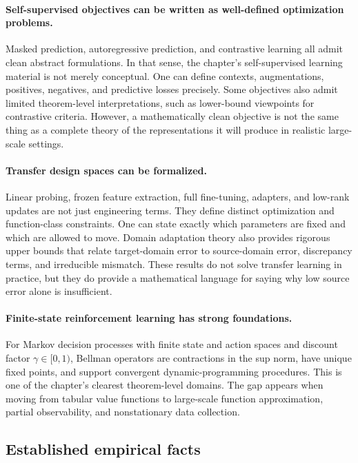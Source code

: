 \paragraph{Self-supervised objectives can be written as well-defined optimization problems.}
Masked prediction, autoregressive prediction, and contrastive learning all admit clean abstract formulations. In that sense, the chapter's self-supervised learning material is not merely conceptual. One can define contexts, augmentations, positives, negatives, and predictive losses precisely. Some objectives also admit limited theorem-level interpretations, such as lower-bound viewpoints for contrastive criteria. However, a mathematically clean objective is not the same thing as a complete theory of the representations it will produce in realistic large-scale settings.

\paragraph{Transfer design spaces can be formalized.}
Linear probing, frozen feature extraction, full fine-tuning, adapters, and low-rank updates are not just engineering terms. They define distinct optimization and function-class constraints. One can state exactly which parameters are fixed and which are allowed to move. Domain adaptation theory also provides rigorous upper bounds that relate target-domain error to source-domain error, discrepancy terms, and irreducible mismatch. These results do not solve transfer learning in practice, but they do provide a mathematical language for saying why low source error alone is insufficient.

\paragraph{Finite-state reinforcement learning has strong foundations.}
For Markov decision processes with finite state and action spaces and discount factor $\gamma \in [0,1)$, Bellman operators are contractions in the sup norm, have unique fixed points, and support convergent dynamic-programming procedures. This is one of the chapter's clearest theorem-level domains. The gap appears when moving from tabular value functions to large-scale function approximation, partial observability, and nonstationary data collection.

\subsection*{Established empirical facts}

